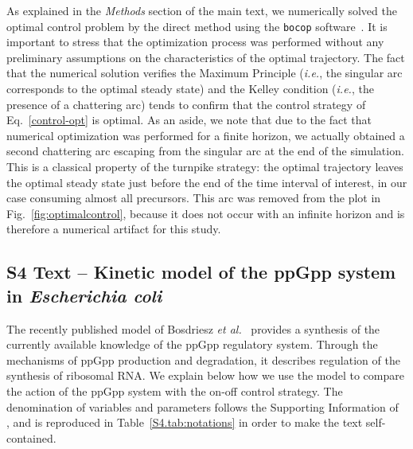 As explained in the \textit{Methods} section of the main text, we numerically solved the optimal control problem by the direct method using the \texttt{bocop} software~\cite{bonnans_bocop_2012}. 
It is important to stress that the optimization process was performed without any preliminary assumptions on the characteristics of the optimal trajectory. 
The fact that the numerical solution verifies the Maximum Principle (\textit{i.e.}, the singular arc corresponds to the optimal steady state) and the Kelley condition (\textit{i.e.}, the presence of a chattering arc)
tends to confirm that the control strategy of Eq.~\ref{control-opt} is optimal. As an aside, we note that due to the fact that numerical optimization was performed for a finite horizon, we actually obtained a second chattering arc escaping from the singular arc at the end of the simulation.  This is a classical property of the turnpike strategy: the optimal trajectory leaves the optimal steady state just before the end of the time interval of interest, in our case consuming almost all precursors. This arc was removed from the plot in Fig.~\ref{fig:optimalcontrol}, because it does not occur with an infinite horizon and is therefore a numerical artifact for this study.

\clearpage

\subsection[S4 Text -- Kinetic model of the ppGpp system]{S4 Text -- Kinetic model of the ppGpp system in \textit{Escherichia coli}}

The recently published model of Bosdriesz \textit{et al.}~\cite{bosdriesz_how_2015} provides a synthesis of the currently available knowledge of the ppGpp regulatory system.
Through the mechanisms of ppGpp production and degradation, it describes regulation of the synthesis of ribosomal RNA.
We explain below how we use the model to compare the action of the ppGpp system with the on-off control strategy.
The denomination of variables and parameters follows the Supporting Information of~\cite{bosdriesz_how_2015} , and is reproduced in Table~\ref{S4.tab:notations} in order to make the text self-contained.


